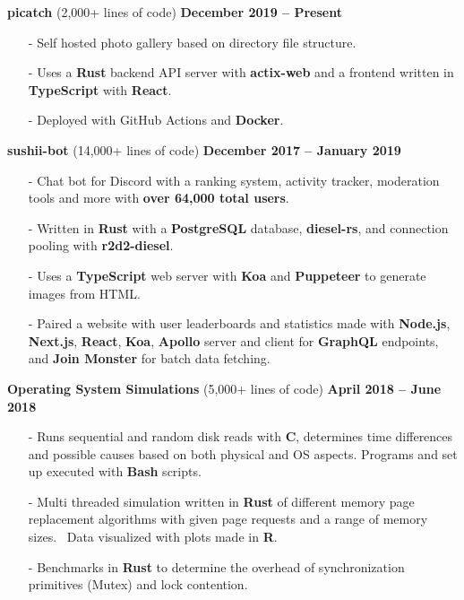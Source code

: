 \documentclass[margin,line]{res}
\begin{document}
\begin{resume}
{\bf picatch} (2,000+ lines of code) \hfill {\bf December 2019 -- Present} \\
  \vspace{-3.5mm}
  \begin{itemize} \itemsep -2pt
    \item[-] Self hosted photo gallery based on directory file structure.
    \item[-] Uses a {\bf Rust} backend API server with {\bf actix-web} and a frontend written in {\bf TypeScript} with {\bf React}.
    \item[-] Deployed with GitHub Actions and {\bf Docker}.
  \end{itemize}
{\bf sushii-bot} (14,000+ lines of code) \hfill {\bf December 2017 -- January 2019} \\
  \vspace{-3.5mm}
  \begin{itemize} \itemsep -2pt
    \item[-] Chat bot for Discord with a ranking system, activity tracker, moderation tools and more with {\bf over 64,000 total users}.
    \item[-] Written in {\bf Rust} with a {\bf PostgreSQL} database, {\bf diesel-rs}, and connection pooling with {\bf r2d2-diesel}.
    \item[-] Uses a {\bf TypeScript} web server with {\bf Koa} and {\bf Puppeteer} to generate images from HTML.
    \item[-] Paired a website with user leaderboards and statistics made with {\bf Node.js}, {\bf Next.js}, {\bf React}, {\bf Koa}, {\bf Apollo} server and client for {\bf GraphQL} endpoints,
      and {\bf Join Monster} for batch data fetching.
  \end{itemize}
{\bf Operating System Simulations} (5,000+ lines of code) \hfill {\bf April 2018 -- June 2018} \\
  \vspace{-3.5mm}
  \begin{itemize} \itemsep -2pt
    \item[-] Runs sequential and random disk reads with {\bf C}, determines time differences and possible causes based on both physical and OS aspects. 
      Programs and set up executed with {\bf Bash} scripts.
    \item[-] Multi threaded simulation written in {\bf Rust} of different memory page replacement algorithms with given page requests and a range of memory sizes. \
    Data visualized with plots made in {\bf R}.
    \item[-] Benchmarks in {\bf Rust} to determine the overhead of synchronization primitives (Mutex) and lock contention.
  \end{itemize}

\end{resume}
\end{document}

